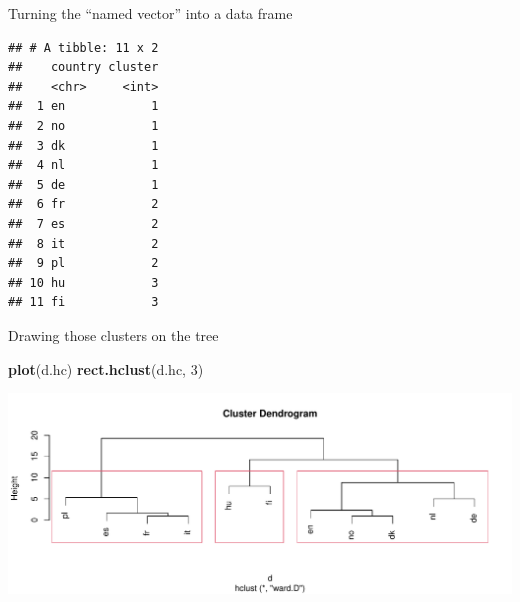\documentclass[
  ignorenonframetext,
]{beamer}
\newenvironment{Shaded}{\begin{snugshade}}{\end{snugshade}}
\newcommand{\DataTypeTok}[1]{\textcolor[rgb]{0.13,0.29,0.53}{#1}}
\newcommand{\DecValTok}[1]{\textcolor[rgb]{0.00,0.00,0.81}{#1}}
\newcommand{\KeywordTok}[1]{\textcolor[rgb]{0.13,0.29,0.53}{\textbf{#1}}}
\newcommand{\NormalTok}[1]{#1}
\newcommand{\OperatorTok}[1]{\textcolor[rgb]{0.81,0.36,0.00}{\textbf{#1}}}
\newcommand{\StringTok}[1]{\textcolor[rgb]{0.31,0.60,0.02}{#1}}
\begin{document}
\begin{frame}[fragile]{Turning the ``named vector'' into a data frame}
\protect\hypertarget{turning-the-named-vector-into-a-data-frame}{}

\footnotesize

\begin{Shaded}
\end{Shaded}

\begin{verbatim}
## # A tibble: 11 x 2
##    country cluster
##    <chr>     <int>
##  1 en            1
##  2 no            1
##  3 dk            1
##  4 nl            1
##  5 de            1
##  6 fr            2
##  7 es            2
##  8 it            2
##  9 pl            2
## 10 hu            3
## 11 fi            3
\end{verbatim}

\scriptsize

\end{frame}

\begin{frame}[fragile]{Drawing those clusters on the tree}
\protect\hypertarget{drawing-those-clusters-on-the-tree}{}

\begin{Shaded}
\begin{Highlighting}[]
\KeywordTok{plot}\NormalTok{(d.hc)}
\KeywordTok{rect.hclust}\NormalTok{(d.hc, }\DecValTok{3}\NormalTok{)}
\end{Highlighting}
\end{Shaded}

\includegraphics{slides_d29_files/figure-beamer/asfsagd-1.pdf}

\end{frame}
\end{document}

